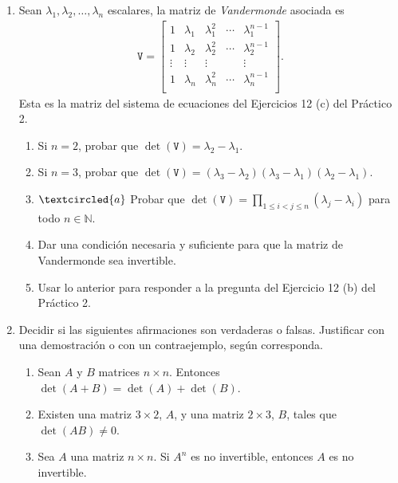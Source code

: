\documentclass[a4paper,12pt,twoside,spanish,reqno]{amsbook}
\numberwithin{equation}{section}
\begin{document}
\begin{enumerate}[topsep=6pt,itemsep=.4cm]
\item\label{vandermonde} Sean $\lambda_1, \lambda_2, \dots, \lambda_n$ escalares, la matriz de \emph{Vandermonde} asociada es
\begin{align*}
\mathtt V = \begin{bmatrix}
1 & \lambda_1 & \lambda_1^2 & \cdots & \lambda_1^{n-1}\\
1 & \lambda_2 & \lambda_2^2 & \cdots & \lambda_2^{n-1}\\
\vdots &\vdots &\vdots & &\vdots\\
1 & \lambda_n & \lambda_n^2 & \cdots & \lambda_n^{n-1}\\
\end{bmatrix}.
\end{align*}
Esta es la matriz del sistema de ecuaciones del Ejercicios 12 (c) del Práctico 2.


\begin{enumerate}
	\item Si $n=2$, probar que $\det(\mathtt V) = \lambda_2-\lambda_1$.
	\item Si $n=3$, probar que $\det(\mathtt V) = (\lambda_3-\lambda_2) (\lambda_3-\lambda_1) (\lambda_2-\lambda_1)$.
	\item\label{vandermonde gral} $\textcircled{a}$ Probar que $\det(\mathtt V) = \prod_{1\leq i< j \leq n}(\lambda_j-\lambda_i)$ para todo $n\in\mathbb{N}$.
	\item Dar una condición necesaria y suficiente para que la matriz de Vandermonde sea invertible.
	\item Usar lo anterior para responder a la pregunta del Ejercicio 12 (b) del Práctico 2.
	\end{enumerate}
	\item Decidir si las siguientes afirmaciones son verdaderas o falsas. Justificar con una demostración o con un contraejemplo, según corresponda.
	\begin{enumerate}
	\item Sean $A$ y $B$ matrices $n \times n$. Entonces $\det(A + B) = \det (A) + \det(B)$.
	\item Existen una matriz $3\times 2$, $A$, y una matriz $2\times 3$, $B$, tales que $\det(AB) \neq 0$.
	\item Sea $A$ una matriz $n\times n$. Si $A^n$ es no invertible, entonces $A$ es no invertible.
\end{enumerate}

\end{enumerate}
\end{document}
